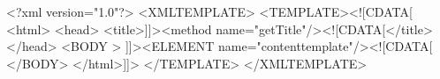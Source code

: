<?xml version="1.0"?> <XMLTEMPLATE>
    <TEMPLATE><![CDATA[
        <html>
            <head>
                <title>]]><method name="getTitle"/><![CDATA[</title>
            </head>
                <BODY >
                    ]]><ELEMENT name="contenttemplate"/><![CDATA[
                </BODY>
        </html>]]>
    </TEMPLATE>
</XMLTEMPLATE>
